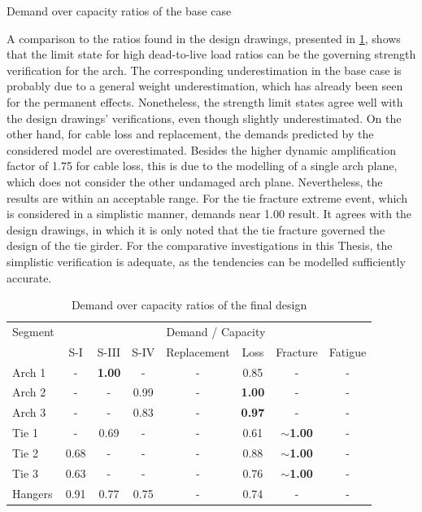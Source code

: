 \begin{table}[H]
    \centering
    \caption{Demand over capacity ratios of the base case}
    \label{tab:dc_base_case}
    
\end{table}

A comparison to the ratios found in the design drawings, presented in \cref{tab:dc_drawings}, shows that the limit state for high dead-to-live load ratios can be the governing strength verification for the arch. The corresponding underestimation in the base case is probably due to a general weight underestimation, which has already been seen for the permanent effects. Nonetheless, the strength limit states agree well with the design drawings' verifications, even though slightly underestimated. On the other hand, for cable loss and replacement, the demands predicted by the considered model are overestimated. Besides the higher dynamic amplification factor of 1.75 for cable loss, this is due to the modelling of a single arch plane, which does not consider the other undamaged arch plane. Nevertheless, the results are within an acceptable range. For the tie fracture extreme event, which is considered in a simplistic manner, demands near 1.00 result. It agrees with the design drawings, in which it is only noted that the tie fracture governed the design of the tie girder. For the comparative investigations in this Thesis, the simplistic verification is adequate, as the tendencies can be modelled sufficiently accurate.

\begin{table}[H]
    \centering
    \caption{Demand over capacity ratios of the final design}
    \label{tab:dc_drawings}
    \begin{tabular}{lccccccc}
    \toprule
    Segment & \multicolumn{7}{c}{Demand / Capacity} \\
     & S-I & S-III & S-IV & Replacement & Loss & Fracture & Fatigue\\ \midrule 
    Arch 1 & - & \textbf{1.00} & - & - & 0.85 & -  & - \\ 
    Arch 2 & - & - & 0.99 & - & \textbf{1.00} & -  & - \\ 
    Arch 3 &  - & - & 0.83 & - & \textbf{0.97} & -  & - \\ 
    Tie 1 & - & 0.69 & - & - & 0.61 & $\sim$\textbf{1.00} & - \\ 
    Tie 2 & 0.68 & - & - & - & 0.88 & $\sim$\textbf{1.00} & - \\ 
    Tie 3 & 0.63 & - & - & - & 0.76 & $\sim$\textbf{1.00} & - \\ 
    Hangers & 0.91 & 0.77 & 0.75 & - & 0.74 & -  & -\\ 
    \bottomrule
\end{tabular}

\end{table}

